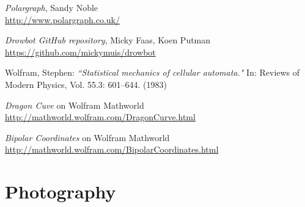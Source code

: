 \documentclass[a4paper,10pt]{article}
\begin{document}
\begin{thebibliography}{9}

  \textit{Polargraph}, Sandy Noble
  \\\url{http://www.polargraph.co.uk/}

  \textit{Drowbot GitHub repository}, Micky Faas, Koen Putman
  \\\url{https://github.com/mickymuis/drowbot}

Wolfram, Stephen:
\textit{``Statistical mechanics of cellular automata."}
In: Reviews of Modern Physics, Vol. 55.3: 601--644.
(1983)

\textit{Dragon Cuve} on Wolfram Mathworld
\\\url{http://mathworld.wolfram.com/DragonCurve.html}

\textit{Bipolar Coordinates} on Wolfram Mathworld
\\\url{http://mathworld.wolfram.com/BipolarCoordinates.html}


\end{thebibliography}



\clearpage
\appendix

\section*{Photography}
\end{document}
